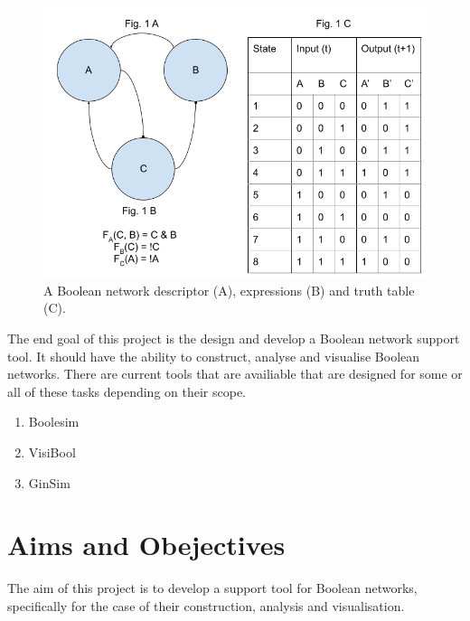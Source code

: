 \documentclass[12pt, letterpaper]{article}
\begin{document}
    \begin{figure}[H]
      \begin{center}
        \includegraphics[scale=0.5]{Fig.1.png}
      \end{center}
      \caption{A Boolean network descriptor (A), expressions (B) and truth table (C).}
      \label{fig:BoolNet}
    \end{figure}

    The end goal of this project is the design and develop a Boolean network support tool. It should 
    have the ability to construct, analyse and visualise Boolean networks. There are current tools
    that are availiable that are designed for some or all of these tasks depending on their scope.
    \begin{enumerate}[noitemsep]
      \item Boolesim \cite{Boolesim}
      \item VisiBool \cite{Visibool}
      \item GinSim \cite{Ginsim}
    \end{enumerate}

  \newpage

  \section{Aims and Obejectives}

    The aim of this project is to develop a support tool for Boolean networks, 
    specifically for the case of their construction, analysis and visualisation.
\end{document}

